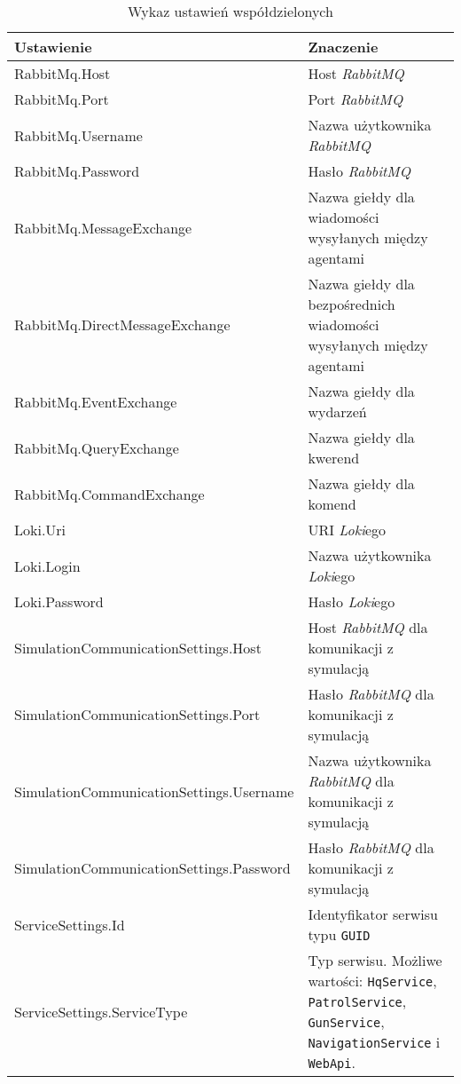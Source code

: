\begin{table}[H]
    \centering
    \begin{tabular}{|p{0.5\linewidth} | p{0.5\linewidth}|} 
     \hline
     Ustawienie & Znaczenie \\
     \hline
     \hline
     RabbitMq.Host & Host \emph{RabbitMQ} \\ 
     \hline
     RabbitMq.Port & Port \emph{RabbitMQ} \\ 
     \hline
     RabbitMq.Username & Nazwa użytkownika \emph{RabbitMQ} \\ 
     \hline
     RabbitMq.Password & Hasło \emph{RabbitMQ} \\ 
     \hline
     RabbitMq.MessageExchange & Nazwa giełdy dla wiadomości wysyłanych między agentami \\ 
     \hline
     RabbitMq.DirectMessageExchange & Nazwa giełdy dla bezpośrednich wiadomości wysyłanych między agentami \\ 
     \hline
     RabbitMq.EventExchange & Nazwa giełdy dla wydarzeń \\ 
     \hline
     RabbitMq.QueryExchange & Nazwa giełdy dla kwerend \\ 
     \hline
     RabbitMq.CommandExchange & Nazwa giełdy dla komend \\ 
     \hline
     Loki.Uri & URI \emph{Loki}ego \\ 
     \hline
     Loki.Login & Nazwa użytkownika \emph{Loki}ego \\ 
     \hline
     Loki.Password & Hasło \emph{Loki}ego \\ 
     \hline
     SimulationCommunicationSettings.Host & Host \emph{RabbitMQ} dla komunikacji z symulacją \\ 
     \hline
     SimulationCommunicationSettings.Port & Hasło \emph{RabbitMQ} dla komunikacji z symulacją \\ 
     \hline
     SimulationCommunicationSettings.Username & Nazwa użytkownika \emph{RabbitMQ} dla komunikacji z symulacją \\ 
     \hline
     SimulationCommunicationSettings.Password & Hasło \emph{RabbitMQ} dla komunikacji z symulacją \\ 
     \hline
     ServiceSettings.Id & Identyfikator serwisu typu \texttt{GUID} \\ 
     \hline
     ServiceSettings.ServiceType & Typ serwisu. Możliwe wartości: \texttt{HqService}, \texttt{PatrolService}, \texttt{GunService}, \texttt{NavigationService} i \texttt{WebApi}. \\ 
     \hline
    \end{tabular}
    \caption{Wykaz ustawień współdzielonych}
    \label{tab:configurationSharedSettings}
\end{table}

